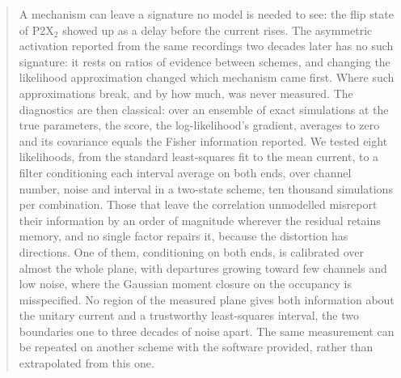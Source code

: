 
\begin{abstract}
A mechanism can leave a signature no model is needed to see: the flip state of P2X$_2$ showed up as a delay before the current rises. The asymmetric activation reported from the same recordings two decades later has no such signature: it rests on ratios of evidence between schemes, and changing the likelihood approximation changed which mechanism came first. Where such approximations break, and by how much, was never measured. The diagnostics are then classical: over an ensemble of exact simulations at the true parameters, the score, the log-likelihood's gradient, averages to zero and its covariance equals the Fisher information reported. We tested eight likelihoods, from the standard least-squares fit to the mean current, to a filter conditioning each interval average on both ends, over channel number, noise and interval in a two-state scheme, ten thousand simulations per combination. Those that leave the correlation unmodelled misreport their information by an order of magnitude wherever the residual retains memory, and no single factor repairs it, because the distortion has directions. One of them, conditioning on both ends, is calibrated over almost the whole plane, with departures growing toward few channels and low noise, where the Gaussian moment closure on the occupancy is misspecified. No region of the measured plane gives both information about the unitary current and a trustworthy least-squares interval, the two boundaries one to three decades of noise apart. The same measurement can be repeated on another scheme with the software provided, rather than extrapolated from this one.
\end{abstract}
